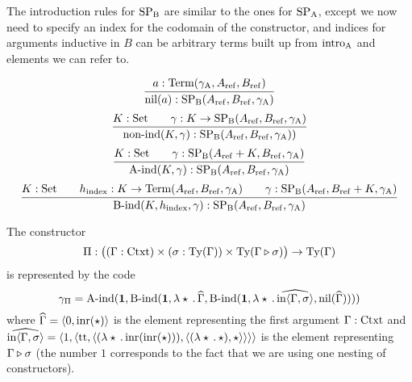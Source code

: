 \documentclass{article}
\begin{document}
The introduction rules for $\text{SP}_{\mathrm{B}}$ are similar to the ones for $\text{SP}_{\mathrm{A}}$,
except we now need to specify an index for the codomain of the
constructor, and indices for arguments inductive in $B$ can be
arbitrary terms built up from $\text{intro}_{\mathrm{A}}$ and elements we can refer to.

\[
\infer{\nilB(a) : \SPB(\Aref, \Bref, \gammaA)}{a : \Aterm(\gammaA, \Aref, \Bref)}
\]
%
%
\[
\infer{\nonindB(K, \gamma) : \SPB(\Aref, \Bref, \gammaA))}{K : \Set & \quad \gamma : K \to \SPB(\Aref, \Bref, \gammaA)}
\]
%
%
\[
\infer{\AindB(K, \gamma) : \SPB(\Aref, \Bref, \gammaA)}{K : \Set & \quad \gamma : \SPB(\Aref + K, \Bref, \gammaA)}
\]
%
%
\[
\infer{\BindB(K, \hindex, \gamma) : \SPB(\Aref, \Bref, \gammaA)}{K : \Set & \quad \hindex : K \to \Aterm(\Aref, \Bref, \gammaA) & \quad \gamma : \SPB(\Aref, \Bref + K, \gammaA)}
\]
%
%
\begin{example}
  The constructor
  \[
  \Pi : \big((\Gamma : \text{Ctxt}) \times (\sigma : \text{Ty}(\Gamma)) \times \text{Ty}(\Gamma \triangleright \sigma)\big)\to \text{Ty}(\Gamma)
  \]
  is represented by the code
  \[
  \gamma_{\Pi} = \text{A-ind}(\mathbf{1},
                  \text{B-ind}(\mathbf{1}, \lambda \star\,.\,\widehat{\Gamma}, 
                    \text{B-ind}(\mathbf{1}, \lambda \star\,.\,\widehat{\text{in}\langle \Gamma , \sigma\rangle},
                      \text{nil}(\widehat{\Gamma}))))
  \]
  where $\widehat{\Gamma} = \langle 0 , \text{inr}(\star)\rangle$ is the element
  representing the first argument $\Gamma : \text{Ctxt}$ and
  $\widehat{\text{in}\langle \Gamma , \sigma\rangle} =
  \langle 1 , \langle \text{tt} , \langle (\lambda
        \star\,.\,\text{inr}(\text{inr}(\star))) , \langle (\lambda
          \star\,.\,\star) , \star\rangle\rangle\rangle\rangle$ is the element
  representing $\Gamma \triangleright \sigma$ (the number $1$ corresponds
  to the fact that we are using one nesting of constructors).
\blackqed
\end{example}
\end{document}
